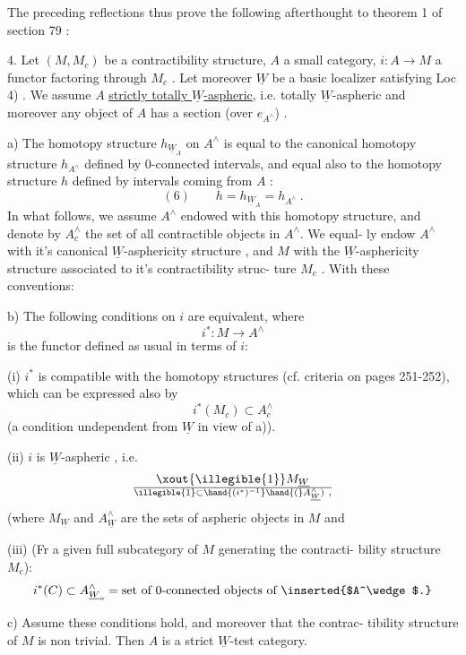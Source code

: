 
The preceding reflections thus prove the following afterthought to
theorem 1 of section 79 :

  4.  Let $(M,M_c)$ be a contractibility structure, $A$ a small
category, $i\colon A\longrightarrow M$ a functor factoring through $M_c$ .  Let
moreover $\underline{W}$ be a basic localizer satisfying Loc 4) . We assume $A$
 \uline{strictly totally $\underline{W}$-aspheric}, i.e. totally $\underline{W}$-aspheric and
moreover any object of $A$ has a section (over $e_{A^\wedge}$) .

a) The homotopy structure $h_{\underline{W}_A}$ on $A^\wedge$ is equal to the canonical
homotopy structure $h_{A^\wedge}$ defined by 0-connected intervals, and equal
also to the homotopy structure $h$ defined by intervals coming from $A$ :
\[ (6) \qquad h = h_{\underline{W}_A} = h_{A^\wedge} \ . \]
In what follows, we assume $A^\wedge$ endowed with this homotopy structure,
and denote by $A^\wedge_c$ the set of all contractible objects in $A^\wedge$. We equal-%
ly endow $A^\wedge$ with it's canonical $\underline{W}$-asphericity structure , and $M$ with
the $\underline{W}$-asphericity structure associated to it's contractibility struc-%
ture $M_c$ . With these conventions:

b) The following conditions on $i$ are equivalent, where
\[ i^* : M \longrightarrow A^\wedge \]
is the functor defined as usual in terms of $i$:

(i) $i^*$ is compatible with the homotopy structures (cf. criteria on
pages 251-252), which can be expressed also by
\[ i^*(M_c) \subset A^\wedge_c \]
(a condition undependent from $\underline{W}$\hand{,} in view of a)).

(ii) $i$ is $\underline{W}$-aspheric , i.e.
\[ \xout{\illegible{1}}M_{\underline{W}} \over{\illegible{1}}{\subset}\hand{(i^*)^{-1}}\hand{(}A^\wedge_{\underline{W}}) \ , \]
(where $M_{\underline{W}}$ and $A^\wedge_{\underline{W}}$ are the sets of  aspheric objects in $M$ and 

(iii) (Fr a given full subcategory  of $M$ generating the contracti-%
bility structure $M_c$):
\[ i^*(C) \subset A^\wedge_{\underline{W}_o} = \text{set of 0-connected objects of } \inserted{$A^\wedge$.} \]

c) Assume these conditions hold, and moreover that the contrac-%
tibility structure of $M$ is non trivial. Then $A$ is a strict $\underline{W}$-test
category.

